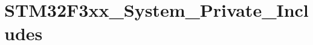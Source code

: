 \hypertarget{group___s_t_m32_f3xx___system___private___includes}{
\section{STM32F3xx\_\-System\_\-Private\_\-Includes}
\label{group___s_t_m32_f3xx___system___private___includes}
}
